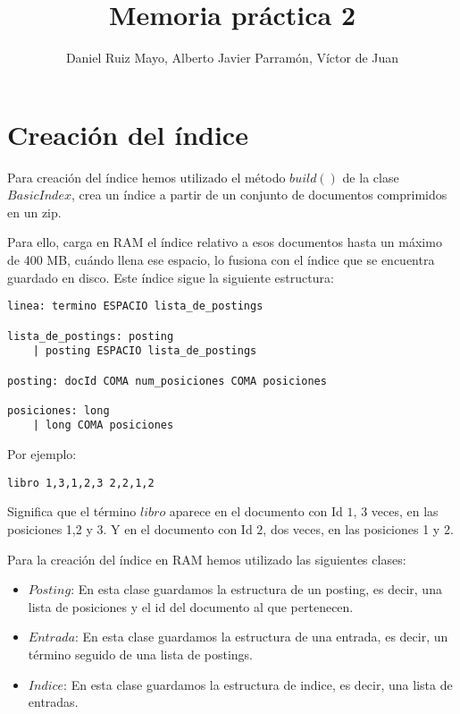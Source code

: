 \documentclass[palatino,nochap]{apuntes}
\title{Memoria práctica 2}
\author{Daniel Ruiz Mayo, Alberto Javier Parramón, Víctor de Juan}
\date{}
\begin{document}
\pagestyle{plain}
\maketitle




\section{Creación del índice}

Para creación del índice hemos utilizado el método $build()$ de la clase $BasicIndex$, crea un índice a partir de un conjunto de documentos comprimidos en un zip.

Para ello, carga en RAM el índice relativo a esos documentos hasta un máximo de 400 MB, cuándo llena ese espacio, lo fusiona con el índice que se encuentra guardado en disco. Este índice sigue la siguiente estructura:

\begin{verbatim}
linea: termino ESPACIO lista_de_postings

lista_de_postings: posting
	| posting ESPACIO lista_de_postings

posting: docId COMA num_posiciones COMA posiciones

posiciones: long
	| long COMA posiciones

\end{verbatim}

Por ejemplo:

\begin{verbatim}
libro 1,3,1,2,3 2,2,1,2
\end{verbatim}

Significa que el término $libro$ aparece en el documento con Id $1$, 3 veces, en las posiciones 1,2 y 3. Y en el documento con Id $2$, dos veces, en las posiciones 1 y 2.

Para la creación del índice en RAM hemos utilizado las siguientes clases:
\begin{itemize}
	\item $Posting$: En esta clase guardamos la estructura de un posting, es decir, una lista de posiciones y el id del documento al que pertenecen.
	\item $Entrada$: En esta clase guardamos la estructura de una entrada, es decir, un término seguido de una lista de postings.
	\item $Indice$: En esta clase guardamos la estructura de indice, es decir, una lista de entradas.
\end{itemize}
\end{document}
